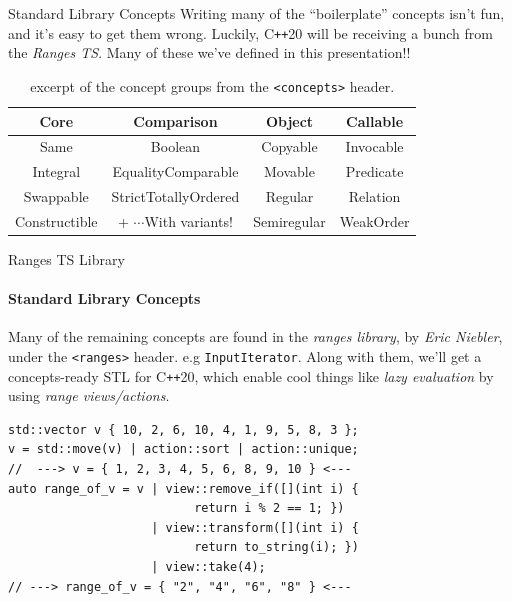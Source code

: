 \documentclass{beamer}
\begin{document}
    \begin{frame}[fragile]{Standard Library Concepts}
        Writing many of the ``boilerplate'' concepts isn't fun, and it's easy to get them wrong. Luckily, C\texttt{++}20 will be receiving a bunch from the \emph{Ranges TS}. Many of these we've defined in this presentation!!
        \vspace{1em}
        \begin{center}
        \begin{table}
        \begin{tabular}{cccc}
            \toprule
            \textbf{Core} & \textbf{Comparison} & \textbf{Object} & \textbf{Callable}\\
            \midrule
            Same & Boolean & Copyable & Invocable \\
            Integral & EqualityComparable & Movable & Predicate \\
            Swappable & StrictTotallyOrdered  & Regular & Relation \\
            Constructible & + $\cdots$With variants!   & Semiregular & WeakOrder \\
            \bottomrule
        \end{tabular}
        \caption{excerpt of the concept groups from the \texttt{<concepts>} header.}
        \end{table}
        \end{center}
    \end{frame}

    \begin{frame}[fragile]{Ranges TS Library}
        \framesubtitle{Standard Library Concepts}
        Many of the remaining concepts are found in the \emph{ranges library}, by \emph{Eric Niebler}, under the \texttt{<ranges>} header. e.g \texttt{InputIterator}. Along with them, we'll get a concepts-ready STL for C\texttt{++}20, which enable cool things like \emph{lazy evaluation} by using \emph{range views/actions}.
        \begin{center}
        \begin{lstlisting}[caption={example of the composability possibilities of range adaptors.}]
std::vector v { 10, 2, 6, 10, 4, 1, 9, 5, 8, 3 };
v = std::move(v) | action::sort | action::unique;
//  ---> v = { 1, 2, 3, 4, 5, 6, 8, 9, 10 } <--- 
auto range_of_v = v | view::remove_if([](int i) {
                          return i % 2 == 1; })
                    | view::transform([](int i) {
                          return to_string(i); })
                    | view::take(4);
// ---> range_of_v = { "2", "4", "6", "8" } <--- \end{lstlisting}
        \end{center}
    \end{frame}
\end{document}
